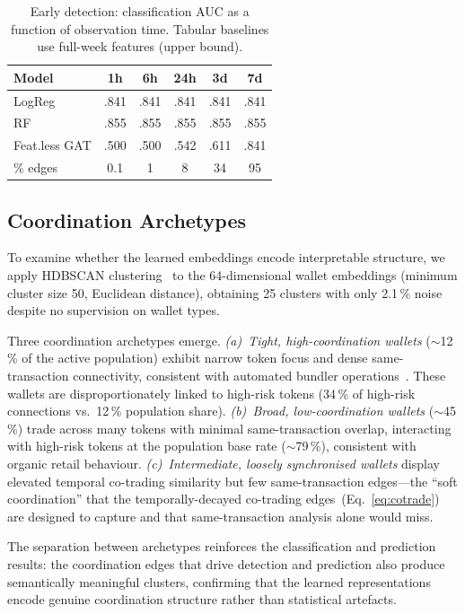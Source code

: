 \documentclass[10pt,journal]{IEEEtran}
\begin{document}
\begin{table}[t]
\caption{Early detection: classification AUC as a function of
observation time. Tabular baselines use full-week features (upper bound).}
\label{tab:early}
\centering\small
\begin{tabular}{lccccc}
\toprule
Model & 1h & 6h & 24h & 3d & 7d \\
\midrule
LogReg & .841 & .841 & .841 & .841 & .841 \\
RF     & .855 & .855 & .855 & .855 & .855 \\
Feat.less GAT & .500 & .500 & .542 & .611 & .841 \\
\% edges & 0.1 & 1 & 8 & 34 & 95 \\
\bottomrule
\end{tabular}
\end{table}


\subsection{Coordination Archetypes}
\label{sec:archetypes}

To examine whether the learned embeddings encode interpretable
structure, we apply HDBSCAN clustering~\cite{mcinnes2017hdbscan} to
the 64-dimensional wallet embeddings (minimum cluster size 50,
Euclidean distance), obtaining 25 clusters with only 2.1\,\% noise
despite no supervision on wallet types.

Three coordination archetypes emerge.
\textit{(a)~Tight, high-coordination wallets} (${\sim}$12\,\% of the
active population) exhibit narrow token focus and dense
same-transaction connectivity, consistent with automated bundler
operations~\cite{hu2026memetrans}. These wallets are
disproportionately linked to high-risk tokens (34\,\% of high-risk
connections vs.\ 12\,\% population share).
\textit{(b)~Broad, low-coordination wallets} (${\sim}$45\,\%) trade
across many tokens with minimal same-transaction overlap, interacting
with high-risk tokens at the population base rate (${\sim}$79\,\%),
consistent with organic retail behaviour.
\textit{(c)~Intermediate, loosely synchronised wallets} display
elevated temporal co-trading similarity but few same-transaction
edges---the ``soft coordination'' that the temporally-decayed
co-trading edges~(Eq.~\ref{eq:cotrade}) are designed to capture and
that same-transaction analysis alone would miss.

The separation between archetypes reinforces the classification and
prediction results: the coordination edges that drive detection and
prediction also produce semantically meaningful clusters, confirming
that the learned representations encode genuine coordination
structure rather than statistical artefacts.
\end{document}
